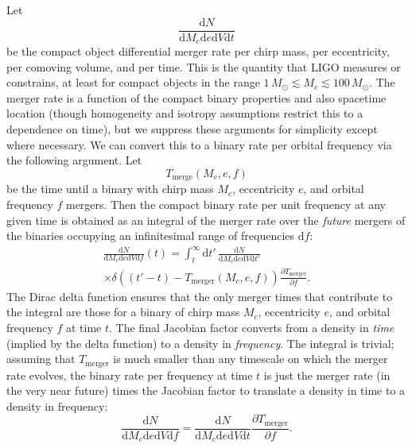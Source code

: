 \documentclass[twocolumn]{aastex631}
\newcommand{\dd}{\mathrm{d}}
\newcommand{\diff}[2]{\frac{\dd #1}{\dd #2}}
\newcommand{\MSun}{M_\odot}
\begin{document}
Let 
\begin{equation}
    \diff{N}{M_c \dd e \dd V \dd t} 
\end{equation}
be the compact object differential merger rate per chirp mass, per eccentricity,
per comoving volume, and per time.  This is the quantity that LIGO measures or
constrains, at least for compact objects in the range $1 \, \MSun \lesssim M_c
\lesssim 100 \, \MSun$.  The merger rate is a function of the compact binary
properties and also spacetime location (though homogeneity and isotropy
assumptions restrict this to a dependence on time), but we suppress these
arguments for simplicity except where necessary.  We can convert this to a
binary rate per orbital frequency via the following argument.  Let 
\begin{equation}
    T_\mathrm{merge}\left( M_c, e, f \right)
\end{equation}
be the time until a binary with chirp mass $M_c$, eccentricity $e$,
and orbital frequency $f$ mergers.  Then the compact binary rate per unit frequency at any given time is
obtained as an integral of the merger rate over the \emph{future} mergers of the
binaries occupying an infinitesimal range of frequencies $\dd f$:
\begin{multline}
    \diff{N}{M_c \dd e \dd V \dd f}\left( t \right) = \int_{t}^{\infty} \dd t' \, \diff{N}{M_c \dd e \dd V \dd t'} \\ \times \delta\left( \left( t' - t \right) - T_\mathrm{merger}\left( M_c, e, f \right) \right) \frac{\partial T_\mathrm{merger}}{\partial f}.
\end{multline}
The Dirac delta function ensures that the only merger times that contribute to
the integral are those for a binary of chirp mass $M_c$, eccentricity $e$, and
orbital frequency $f$ at time $t$.  The final Jacobian factor converts from a
density in \emph{time} (implied by the delta function) to a density in
\emph{frequency}.  The integral is trivial; assuming that $T_\mathrm{merger}$ is
much smaller than any timescale on which the merger rate evolves, the binary
rate per frequency at time $t$ is just the merger rate (in the very near future)
times the Jacobian factor to translate a density in time to a density in
frequency:
\begin{equation}
    \label{eq:mergers-per-frequency}
    \diff{N}{M_c \dd e \dd V \dd f} = \diff{N}{M_c \dd e \dd V \dd t} \frac{\partial T_\mathrm{merger}}{\partial f}.
\end{equation}
\end{document}
